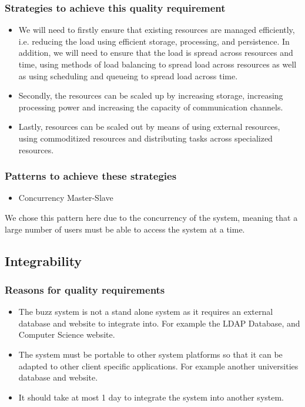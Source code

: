 \documentclass[a4paper,12pt]{report}
\begin{document}
	\subsubsection{Strategies to achieve this quality requirement}
	\begin{itemize}
		\item We will need to firstly ensure that existing resources are managed efficiently, i.e. reducing the load using efficient storage, processing,  and persistence. In addition, we will need to ensure that the load is spread across resources and time, using methods of load balancing to spread load across resources as well as using scheduling and queueing to spread load across time.
		\item Secondly, the resources can be scaled up by increasing storage, increasing processing power and increasing the capacity of communication channels.
		\item Lastly, resources can be scaled out by means of using external resources, using commoditized resources and distributing tasks across specialized resources.
		\end{itemize}
	\subsubsection{Patterns to achieve these strategies}
	 \begin{itemize}
		\item Concurrency Master-Slave 
	\end{itemize}
We chose this pattern here due to the concurrency of the system, meaning that a large number of users must be able to access the system at a time.
 
 \subsection{Integrability}
 \subsubsection{Reasons for quality requirements}
 \begin{itemize}
 \item The buzz system is not a stand alone system as it requires an external database and website to integrate into. For example the LDAP Database, and Computer Science website.
\item The system must be portable to other system platforms so that it can be adapted to other client specific applications. For example another universities database and website.
\item It should take at most 1 day to integrate the system into another system.  
 \end{itemize}
\end{document}
